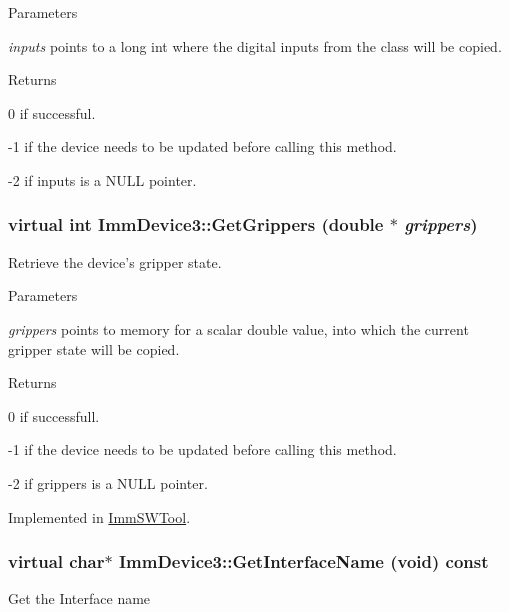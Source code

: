 \begin{DoxyParams}{Parameters}
\item[{\em inputs}]points to a long int where the digital inputs from the class will be copied.\end{DoxyParams}
\begin{DoxyReturn}{Returns}

\end{DoxyReturn}
0 if successful.

-\/1 if the device needs to be updated before calling this method.

-\/2 if inputs is a NULL pointer. \hypertarget{classImmDevice3_ad83c6941b396eb3e8f3acee9ed7dacfb}{
\subsubsection[{GetGrippers}]{\setlength{\rightskip}{0pt plus 5cm}virtual int ImmDevice3::GetGrippers (double $\ast$ {\em grippers})}}
\label{classImmDevice3_ad83c6941b396eb3e8f3acee9ed7dacfb}
Retrieve the device's gripper state.


\begin{DoxyParams}{Parameters}
\item[{\em grippers}]points to memory for a scalar double value, into which the current gripper state will be copied.\end{DoxyParams}
\begin{DoxyReturn}{Returns}

\end{DoxyReturn}
0 if successfull.

-\/1 if the device needs to be updated before calling this method.

-\/2 if grippers is a NULL pointer. 

Implemented in \hyperlink{classImmSWTool_ae6e63083a9e1513a7639a27d550e2cf6}{ImmSWTool}.\hypertarget{classImmDevice3_a7a827a9b1db6ed6f84147f3b266781ca}{
\subsubsection[{GetInterfaceName}]{\setlength{\rightskip}{0pt plus 5cm}virtual char$\ast$ ImmDevice3::GetInterfaceName (void) const}}
\label{classImmDevice3_a7a827a9b1db6ed6f84147f3b266781ca}
Get the Interface name

